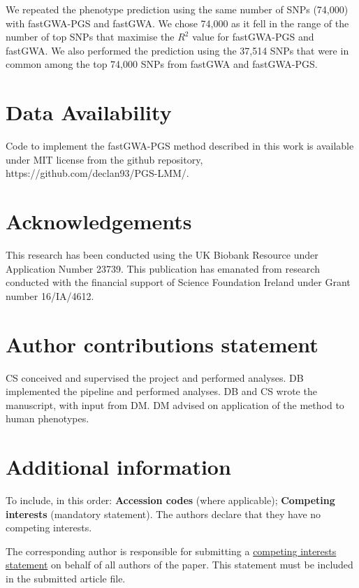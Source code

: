 \documentclass[fleqn,10pt]{wlscirep}
\begin{document}
We repeated the phenotype prediction using the same number of SNPs (74,000) with fastGWA-PGS and fastGWA. We chose 74,000 as it fell in the range of the number of top SNPs that maximise the $R^2$ value for fastGWA-PGS and fastGWA. We also performed the prediction using the 37,514 SNPs that were in common among the top 74,000 SNPs from fastGWA and fastGWA-PGS.

\section*{Data Availability}
Code to implement the fastGWA-PGS method described in this work is available under MIT license from the github repository, https://github.com/declan93/PGS-LMM/.
\par\par 


\section*{Acknowledgements}

This research has been conducted using the UK Biobank Resource under Application Number 23739. This publication has emanated from research conducted with the financial support of Science Foundation Ireland under Grant number 16/IA/4612.

\section*{Author contributions statement}

CS conceived and supervised the project and performed analyses. DB implemented the pipeline and performed analyses. DB and CS wrote the manuscript, with input from DM. DM advised on application of the method to human phenotypes.

\section*{Additional information}

To include, in this order: \textbf{Accession codes} (where applicable); \textbf{Competing interests} (mandatory statement). The authors declare that they have no competing interests. 

The corresponding author is responsible for submitting a \href{http://www.nature.com/srep/policies/index.html#competing}{competing interests statement} on behalf of all authors of the paper. This statement must be included in the submitted article file.
\end{document}
